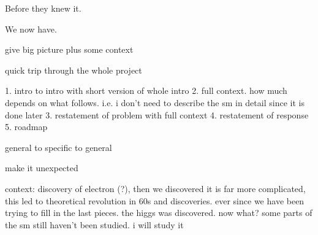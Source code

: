 Before they knew it.


We now have.


give big picture plus some context

quick trip through the whole project

1. intro to intro with short version of whole intro
2. full context. how much depends on what follows. i.e. i don't need to describe the sm in detail since it is done later
3. restatement of problem with full context
4. restatement of response
5. roadmap


general to specific to general

make it unexpected

context: discovery of electron (?), then we discovered it is far more complicated, this led to theoretical revolution in 60s and discoveries. ever since we have been trying to fill in the last pieces. the higgs was discovered. now what?
some parts of the sm still haven't been studied.
i will study it











